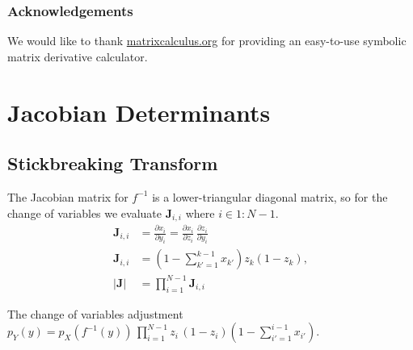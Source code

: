 \documentclass[11pt]{article}
\newcommand{\abs}[1]{\left| #1 \right|}
\begin{document}
\subsubsection*{Acknowledgements}

We would like to thank \url{matrixcalculus.org} for providing an
easy-to-use symbolic matrix derivative calculator.



{}


\appendix
\section{Jacobian Determinants}
\subsection{Stickbreaking Transform}
The Jacobian matrix for $f^{-1}$ is a lower-triangular diagonal matrix, so for the change of variables we evaluate $\mathbf{J}_{i, i}$ where $i \in 1:N-1$.
\begin{align*}
\mathbf{J}_{i, i} &= \frac{\partial x_i}{\partial y_i}
=
\frac{\partial x_i}{\partial z_i} \,
\frac{\partial z_i}{\partial y_i}\\
\mathbf{J}_{i, i} &= \left(
  1 - \sum_{k' = 1}^{k-1} x_{k'}
   \right) z_k (1 - z_k),\\
   \abs{\textbf{J}} &= \prod_{i=1}^{N-1} \textbf{J}_{i,i}
\end{align*}

The change of variables adjustment $p_Y(y) = p_X(f^{-1}(y))\,
\prod_{i=1}^{N-1}z_i\,(1 - z_i)\left(1 - \sum_{i'=1}^{i-1} x_{i'}\right).$
\end{document}

